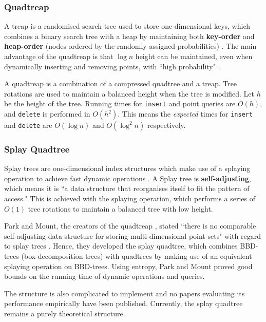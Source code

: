 \subsubsection{Quadtreap}

A treap is a randomised search tree used to store one-dimensional keys, which combines a binary search tree with a heap by maintaining both \textbf{key-order} and \textbf{heap-order} (nodes ordered by the randomly assigned probabilities) \cite{quadtreap}. The main advantage of the quadtreap is that $\log n$ height can be maintained, even when dynamically inserting and removing points, with ``high probability" \cite{quadtreap}.

A quadtreap is a combination of a compressed quadtree and a treap. Tree rotations are used to maintain a balanced height when the tree is modified. Let $h$ be the height of the tree. Running times for \texttt{insert} and point queries are $O(h)$, and \texttt{delete} is performed in $O(h^2)$. This means the \textit{expected} times for \texttt{insert} and \texttt{delete} are $O(\log n)$ and $O(\log^2 n)$ respectively.

\subsubsection{Splay Quadtree}
\label{sec:splay-quadtree}

Splay trees are one-dimensional index structures which make use of a splaying operation to achieve fast dynamic operations \cite{introduction-to-algorithms}. A Splay tree is \textbf{self-adjusting}, which means it is ``a data structure that reorganises itself to fit the pattern of access." \cite{splay-quadtree} This is achieved with the splaying operation, which performs a series of $O(1)$ tree rotations to maintain a balanced tree with low height.

Park and Mount, the creators of the quadtreap \cite{quadtreap}, stated ``there is no comparable self-adjusting data structure for storing multi-dimensional point sets" with regard to splay trees \cite{splay-quadtree}. Hence, they developed the splay quadtree, which combines BBD-trees (box decomposition trees) with quadtrees by making use of an equivalent splaying operation on BBD-trees. Using entropy, Park and Mount proved good bounds on the running time of dynamic operations and queries.

The structure is also complicated to implement and no papers evaluating its performance empirically have been published. Currently, the splay quadtree remains a purely theoretical structure.